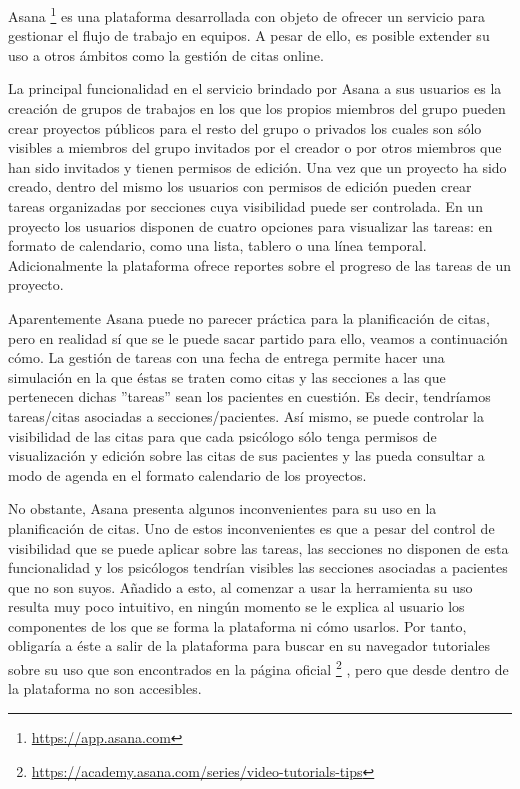 Asana \footnote{\url{https://app.asana.com}} es una plataforma desarrollada con objeto de ofrecer un servicio para gestionar el flujo de trabajo en equipos. A pesar de ello, es posible extender su uso a otros ámbitos como la gestión de citas online. \bigskip

La principal funcionalidad en el servicio brindado por Asana a sus usuarios es la creación de grupos de trabajos en los que los propios miembros del grupo pueden crear proyectos públicos para el resto del grupo o privados los cuales son sólo visibles a miembros del grupo invitados por el creador o por otros miembros que han sido invitados y tienen permisos de edición. Una vez que un proyecto ha sido creado, dentro del mismo los usuarios con permisos de edición pueden crear tareas organizadas por secciones cuya visibilidad puede ser controlada. En un proyecto los usuarios disponen de cuatro opciones para visualizar las tareas: en formato de calendario, como una lista, tablero o una línea temporal. Adicionalmente la plataforma ofrece reportes sobre el progreso de las tareas de un proyecto. \bigskip

Aparentemente Asana puede no parecer práctica para la planificación de citas, pero en realidad sí que se le puede sacar partido para ello, veamos a continuación cómo. La gestión de tareas con una fecha de entrega permite hacer una simulación en la que éstas se traten como citas y las secciones a las que pertenecen dichas ''tareas'' sean los pacientes en cuestión. Es decir, tendríamos tareas/citas asociadas a secciones/pacientes. Así mismo, se puede controlar la visibilidad de las citas para que cada psicólogo sólo tenga permisos de visualización y edición sobre las citas de sus pacientes y las pueda consultar a modo de agenda en el formato calendario de los proyectos. \bigskip

No obstante, Asana presenta algunos inconvenientes para su uso en la planificación de citas. Uno de estos inconvenientes es que a pesar del control de visibilidad que se puede aplicar sobre las tareas, las secciones no disponen de esta funcionalidad y los psicólogos tendrían visibles las secciones asociadas a pacientes que no son suyos. Añadido a esto, al comenzar a usar la herramienta su uso resulta muy poco intuitivo, en ningún momento se le explica al usuario los componentes de los que se forma la plataforma ni cómo usarlos. Por tanto, obligaría a éste a salir de la plataforma para buscar en su navegador tutoriales sobre su uso que son encontrados en la página oficial \footnote{\url{https://academy.asana.com/series/video-tutorials-tips}} , pero que desde dentro de la plataforma no son accesibles. \bigskip


